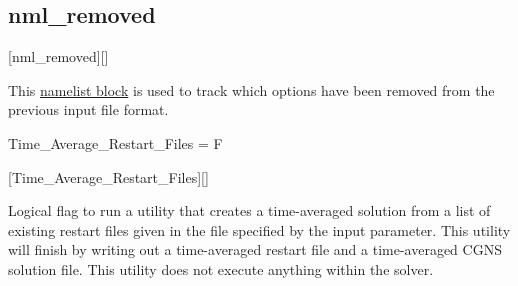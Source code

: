 \subsection{nml\_removed}
\label{SEC:nml_removed}
\inp*[nmlRemoved]{}[nml\_removed][]

This \hyperref[SEC:User_Input]{namelist block}
is used to track which options have been removed from the previous
input file format.


\begin{nmldescitem}
Time_Average_Restart_Files = F
\end{nmldescitem}
[Time\_Average\_Restart\_Files][]

\begin{nmldescbody}
Logical flag to run a utility that creates a time-averaged solution from a
list of existing restart files given in the file specified by the
 input parameter. This utility will finish by
writing out a time-averaged restart file and a time-averaged CGNS solution
file. This utility does not execute anything within the solver.
\end{nmldescbody}




